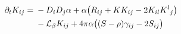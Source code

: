 \documentclass[preview]{standalone}
\begin{document}
\begin{align*}
\special{dvisvgm:raw <g id='unique000'>}\begin{aligned}\partial_t K_{ij} = {}& -D_iD_j\alpha + \alpha\big(R_{ij} + K K_{ij} - 2K_{il}K^l{}_j\big)\\&- \mathcal{L}_\beta K_{ij} + 4\pi\alpha\big((S-\rho)\gamma_{ij} - 2S_{ij}\big)\end{aligned}\special{dvisvgm:raw </g>}
\end{align*}
\end{document}
